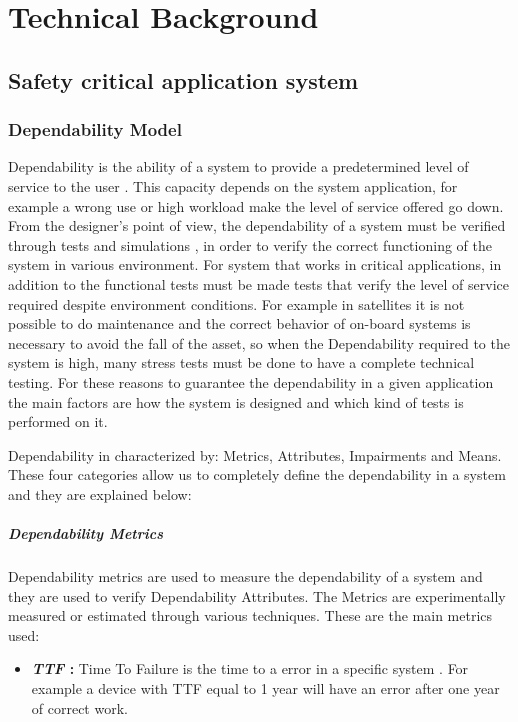 \chapter{Technical Background}{
	\section{Safety critical application system}{
		\newpage
		\subsection{Dependability Model}{
			Dependability is the ability of a system to provide a predetermined level of service to the user . This capacity depends on the system application, for example a wrong use or high workload make the level of service offered go down. From the designer's point of view, the dependability of a system must be verified through tests and simulations , in order to verify the correct functioning of the system in various environment. For system that works in critical applications, in addition to the functional tests must be made tests that verify the level of service required despite environment conditions. For example in satellites it is not possible to do maintenance and the correct behavior of on-board systems is necessary to avoid the fall of the asset, so when the Dependability required to the system is high, many stress tests must be done to have a complete technical testing. For these reasons to guarantee the dependability in a given application the main factors are how the system is designed and which kind of tests is performed on it.
			
			Dependability in characterized by: Metrics, Attributes, Impairments and Means. These four categories allow us to completely define the dependability in a system and they are explained below:
			\paragraph{Dependability Metrics}{
				Dependability metrics are used to measure the dependability of a system and they are used to verify Dependability Attributes. The Metrics are experimentally measured or estimated through various techniques. These are the main metrics used: 
				\begin{itemize}
					\item \textbf{\textit{TTF} : } Time To Failure is the time to a error in a specific system . For example a device with TTF equal to 1 year will have an error after one year of correct work.
		

\end{itemize}}}}}
